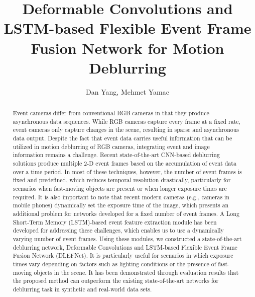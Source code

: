 \documentclass{article}
\begin{document}
\title{Deformable Convolutions and LSTM-based
Flexible Event Frame Fusion Network for
Motion Deblurring}
\author{Dan Yang, Mehmet Yamac}
\maketitle              \begin{abstract}
  Event cameras differ from conventional RGB cameras in that they produce asynchronous 
data sequences. While RGB cameras capture every frame at a fixed rate, 
event cameras only capture changes in the scene, resulting in sparse and 
asynchronous data output. Despite the fact that event data carries useful 
information that can be utilized in motion deblurring of RGB cameras, 
integrating event and image information remains a challenge. 
Recent state-of-the-art CNN-based deblurring solutions produce multiple 2-D event 
frames based on the accumulation of event data over a time period. In most of 
these techniques, however, the number of event frames is fixed and predefined, 
which reduces temporal resolution drastically, particularly for scenarios when 
fast-moving objects are present or when longer exposure times are required. It is 
also important to note that recent modern cameras (e.g., cameras in mobile phones) 
dynamically set the exposure time of the image, which presents an additional problem 
for networks developed for a fixed number of event frames. A Long 
Short-Term Memory (LSTM)-based event feature extraction module has been developed for 
addressing these challenges, which enables us to use a dynamically varying number of 
event frames. Using these modules, we constructed a state-of-the-art deblurring network, 
Deformable Convolutions and LSTM-based Flexible Event Frame Fusion Network (DLEFNet). It 
is particularly useful for scenarios in which exposure times vary depending on factors 
such as lighting conditions or the presence of fast-moving objects in the scene. It has 
been demonstrated through evaluation results that the proposed method can outperform the 
existing state-of-the-art networks for deblurring task in synthetic and real-world data 
sets.
\end{abstract}
\end{document}
